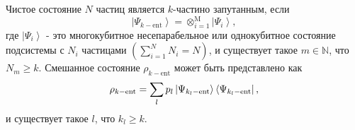 Чистое состояние $N$ частиц является $k$-частино запутанным, если
%
\begin{equation}
  \left| \Psi_{k-\mathrm{ent}} \right\rangle
  = \otimes^\mathrm{M}_{i=1} \left| \Psi_{i} \right\rangle,
\end{equation}
%
где $\left| \Psi_{i} \right\rangle$ - это многокубитное несепарабельное или однокубитное состояние подсистемы с $N_i$ частицами
$\left( \sum_{i=1}^N N_i = N \right)$,
и существует такое  $ m \in \mathbb{N}$, что $N_{m} \ge k$.
Смешанное состояние $\rho_{k-\mathrm{ent}}$ может быть представлено как
%
\begin{equation}
  \rho_{k-\mathrm{ent}} =
  \sum\limits_{l} p_l \left| \Psi_{k_l-\mathrm{ent}} \right\rangle\left\langle \Psi_{k_l-\mathrm{ent}} \right|,
  \end{equation}
%
и существует такое $l$, что $k_l \geq k$.
